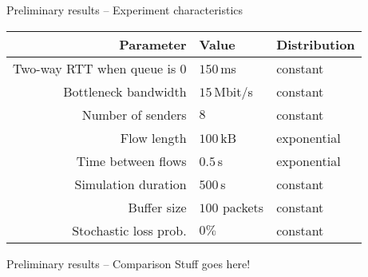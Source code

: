 \documentclass[11pt]{beamer}
\begin{document}
\begin{frame}{Preliminary results -- Experiment characteristics}
\centering
\begin{tabular}{rll}
\toprule
Parameter & Value & Distribution \\
\midrule
Two-way RTT when queue is 0 & $150\,$ms & constant \\
Bottleneck bandwidth & $15\,$Mbit/s & constant \\
Number of senders & $8$ & constant \\
Flow length & $100\,$kB & exponential \\
Time between flows & $0.5\,$s & exponential \\
Simulation duration & $500\,$s & constant \\
Buffer size & $100$ packets & constant \\
Stochastic loss prob. & $0\%$ & constant \\
\bottomrule
\end{tabular}
\end{frame}

\begin{frame}{Preliminary results -- Comparison}
Stuff goes here!
\end{frame}
\end{document}
